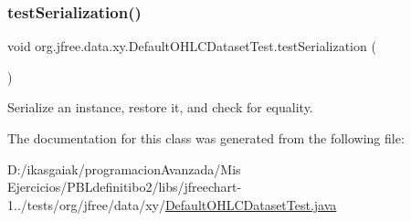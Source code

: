 \subsubsection{\texorpdfstring{test\+Serialization()}{testSerialization()}}
{\footnotesize\ttfamily void org.\+jfree.\+data.\+xy.\+Default\+O\+H\+L\+C\+Dataset\+Test.\+test\+Serialization (\begin{DoxyParamCaption}{ }\end{DoxyParamCaption})}

Serialize an instance, restore it, and check for equality. 

The documentation for this class was generated from the following file\+:\begin{DoxyCompactItemize}
\item 
D\+:/ikasgaiak/programacion\+Avanzada/\+Mis Ejercicios/\+P\+B\+Ldefinitibo2/libs/jfreechart-\/1../tests/org/jfree/data/xy/\mbox{\hyperlink{_default_o_h_l_c_dataset_test_8java}{Default\+O\+H\+L\+C\+Dataset\+Test.\+java}}\end{DoxyCompactItemize}
